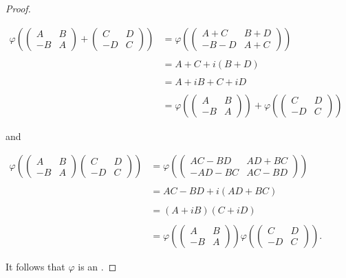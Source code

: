\documentclass[12pt]{article}
\begin{document}
\begin{proof}
\begin{center}
$\begin{array}{rl}
\displaystyle \varphi \left( \left( \begin{array}{cc}
A & B \\
-B & A \end{array}
\right) + \left( \begin{array}{cc}
C & D \\
-D & C \end{array}
\right) \right) & \displaystyle =\varphi \left( \left( \begin{array}{cc}
A+C & B+D \\
-B-D & A+C \end{array}
\right) \right) \\
\\
& =A+C+i(B+D) \\
\\
& =A+iB+C+iD \\
\\
& \displaystyle =\varphi \left( \left( \begin{array}{cc}
A & B \\
-B & A \end{array}
\right) \right) + \varphi \left( \left( \begin{array}{cc}
C & D \\
-D & C \end{array}
\right) \right) \end{array}$
\end{center}

and

\begin{center}
$\begin{array}{rl}
\displaystyle \varphi \left( \left( \begin{array}{cc}
A & B \\
-B & A \end{array}
\right) \left( \begin{array}{cc}
C & D \\
-D & C \end{array}
\right) \right) & \displaystyle =\varphi \left( \left( \begin{array}{cc}
AC-BD & AD+BC \\
-AD-BC & AC-BD \end{array}
\right) \right) \\
\\
& =AC-BD+i(AD+BC) \\
\\
& =(A+iB)(C+iD) \\
\\
& \displaystyle =\varphi \left( \left( \begin{array}{cc}
A & B \\
-B & A \end{array}
\right) \right) \varphi \left( \left( \begin{array}{cc}
C & D \\
-D & C \end{array}
\right) \right) . \end{array}$
\end{center}

It follows that $\varphi$ is an .
\end{proof}
\end{document}
